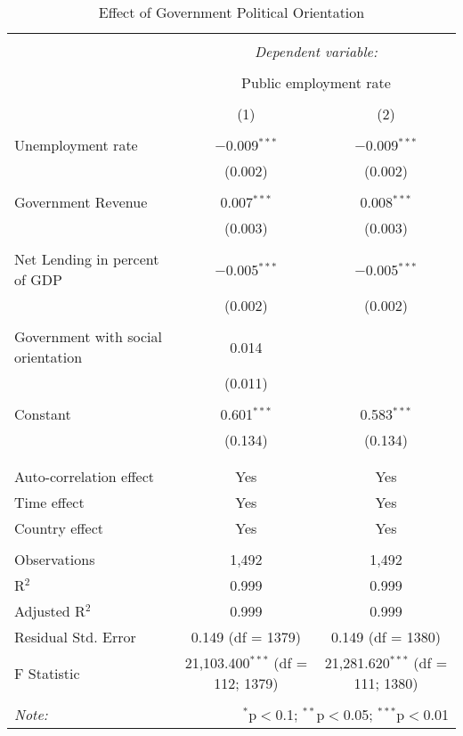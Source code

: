 
\begin{table}[!htbp] \centering 
  \caption{Effect of Government Political Orientation} 
  \label{} 
\begin{tabular}{@{\extracolsep{5pt}}lcc} 
\\[-1.8ex]\hline 
\hline \\[-1.8ex] 
 & \multicolumn{2}{c}{\textit{Dependent variable:}} \\ 
\cline{2-3} 
\\[-1.8ex] & \multicolumn{2}{c}{Public employment rate} \\ 
\\[-1.8ex] & (1) & (2)\\ 
\hline \\[-1.8ex] 
 Unemployment rate & $-$0.009$^{***}$ & $-$0.009$^{***}$ \\ 
  & (0.002) & (0.002) \\ 
  & & \\ 
 Government Revenue & 0.007$^{***}$ & 0.008$^{***}$ \\ 
  & (0.003) & (0.003) \\ 
  & & \\ 
 Net Lending in percent of GDP & $-$0.005$^{***}$ & $-$0.005$^{***}$ \\ 
  & (0.002) & (0.002) \\ 
  & & \\ 
 Government with social orientation & 0.014 &  \\ 
  & (0.011) &  \\ 
  & & \\ 
 Constant & 0.601$^{***}$ & 0.583$^{***}$ \\ 
  & (0.134) & (0.134) \\ 
  & & \\ 
\hline \\[-1.8ex] 
Auto-correlation effect & Yes & Yes \\ 
Time effect & Yes & Yes \\ 
Country effect & Yes & Yes \\ 
\hline \\[-1.8ex] 
Observations & 1,492 & 1,492 \\ 
R$^{2}$ & 0.999 & 0.999 \\ 
Adjusted R$^{2}$ & 0.999 & 0.999 \\ 
Residual Std. Error & 0.149 (df = 1379) & 0.149 (df = 1380) \\ 
F Statistic & 21,103.400$^{***}$ (df = 112; 1379) & 21,281.620$^{***}$ (df = 111; 1380) \\ 
\hline 
\hline \\[-1.8ex] 
\textit{Note:}  & \multicolumn{2}{r}{$^{*}$p$<$0.1; $^{**}$p$<$0.05; $^{***}$p$<$0.01} \\ 
\end{tabular} 
\end{table} 
